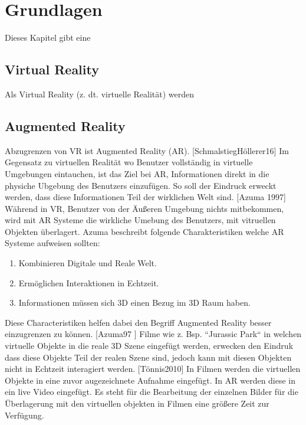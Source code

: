 \chapter{Grundlagen}

Dieses Kapitel gibt eine  

\section{Virtual Reality} 

Als Virtual Reality (z. dt. virtuelle Realität) werden 



\section{Augmented Reality}

Abzugrenzen von VR  ist Augmented Reality (AR). [SchmalstiegHöllerer16] Im Gegensatz zu virtuellen Realität wo Benutzer vollständig in virtuelle Umgebungen eintauchen,
ist das Ziel bei AR, Informationen direkt in die physiche Ubgebung des Benutzers einzufügen. So soll der Eindruck erweckt werden, dass diese Informationen
Teil der wirklichen Welt sind. %
[Azuma 1997] Während in VR, Benutzer von der Äußeren Umgebung nichts mitbekommen, wird mit AR Systeme die wirkliche Umebung des Benutzers, mit vitruellen Objekten überlagert. 
Azuma beschreibt folgende Charakteristiken welche AR Systeme aufweisen sollten: 

\begin{enumerate}
	\item Kombinieren Digitale und Reale Welt.
	\item Ermöglichen Interaktionen in Echtzeit.
	\item Informationen müssen sich 3D einen Bezug im 3D Raum haben.
\end{enumerate}

Diese Characteristiken helfen dabei den Begriff Augmented Reality besser einzugrenzen zu können. 
[Azuma97 ] Filme wie z. Bsp.  ``Jurassic Park`` in welchen virtuelle Objekte in die reale 3D Szene eingefügt werden, erwecken den Eindruk dass diese Objekte Teil der realen Szene sind, jedoch kann mit diesen 
Objekten nicht in Echtzeit interagiert werden. [Tönnis2010] In Filmen werden die virtuellen Objekte in eine zuvor augezeichnete Aufnahme eingefügt. In AR werden diese in ein live Video eingefügt. Es steht für die Bearbeitung der einzelnen 
Bilder für die Überlagerung mit den virtuellen objekten in Filmen eine größere Zeit zur Verfügung.

